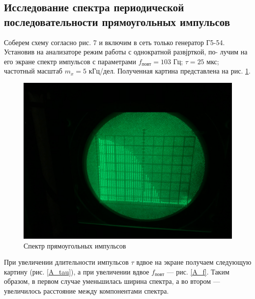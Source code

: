 \documentclass[a4paper, 14pt]{extarticle}%
\begin{document}
  	\subsection{Исследование спектра периодической последовательности прямоугольных импульсов}
  	
  	Соберем схему согласно рис. 7 и включим в сеть только генератор Г5-54.
 	Установив на анализаторе режим работы с однократной развјрткой, по-
  	лучим на его экране спектр импульсов с параметрами $ f_{повт}  = 103 $ Гц;
  $ \tau= 25 $ мкс; частотный масштаб $ m_x = 5 $ кГц/дел. Полученная картина представлена на рис. \ref{A_or}. 
  
  \begin{figure}[h]
  	\centering
  	\includegraphics[width=0.65\linewidth]{pictures/A_or.jpg}
  	\caption{Спектр прямоугольных импульсов}
  	\label{A_or}
  \end{figure}
  
  При увеличении длительности импульсов $ \tau $ вдвое на экране получаем следующую картину (рис. \ref{A_tau}), а при увеличении вдвое $ f_{повт} $ --- рис. \ref{A_f}. Таким образом, в первом случае уменьшилась ширина спектра, а во втором --- увеличилось расстояние между компонентами спектра.
  
\end{document}
